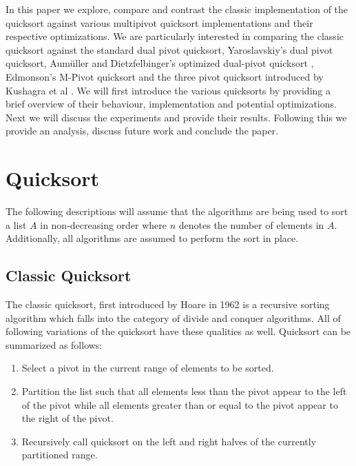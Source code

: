     In this paper we explore, compare and contrast the classic implementation of the quicksort against various multipivot quicksort implementations and their respective optimizations. We are particularly interested in comparing the classic quicksort against the standard dual pivot quicksort, Yaroslavskiy's dual pivot quicksort\cite{yaroslavskiy2009dual}, Aum\"{u}ller and Dietzfelbinger's optimized dual-pivot quicksort \cite{Aumuller:2013:OPD:2525857.2525862}, Edmonson's M-Pivot quicksort \cite{edmondson2005m} and the three pivot quicksort introduced by Kushagra et al \cite{kushagra2013multi}. We will first introduce the various quicksorts by providing a brief overview of their behaviour, implementation and potential optimizations. Next we will discuss the experiments and provide their results. Following this we provide an analysis, discuss future work and conclude the paper. 

\section{Quicksort}
	The following descriptions will assume that the algorithms are being used to sort a list $A$ in non-decreasing order where $n$ denotes the number of elements in $A$. Additionally, all algorithms are assumed to perform the sort in place. 

	\subsection{Classic Quicksort}
		\label{subsec:ClassicQSortIntro}
        The classic quicksort, first introduced by Hoare \cite{Hoare01011962} in 1962 is a recursive sorting algorithm which falls into the category of divide and conquer algorithms. All of following variations of the quicksort have these qualities as well. Quicksort can be summarized as follows:
        \begin{enumerate}
			\item Select a pivot in the current range of elements to be sorted.
			\item Partition the list such that all elements less than the pivot appear to the left of the pivot while all elements greater than or equal to the pivot appear to the right of the pivot.
			\item Recursively call quicksort on the left and right halves of the currently partitioned range.
        \end{enumerate}


